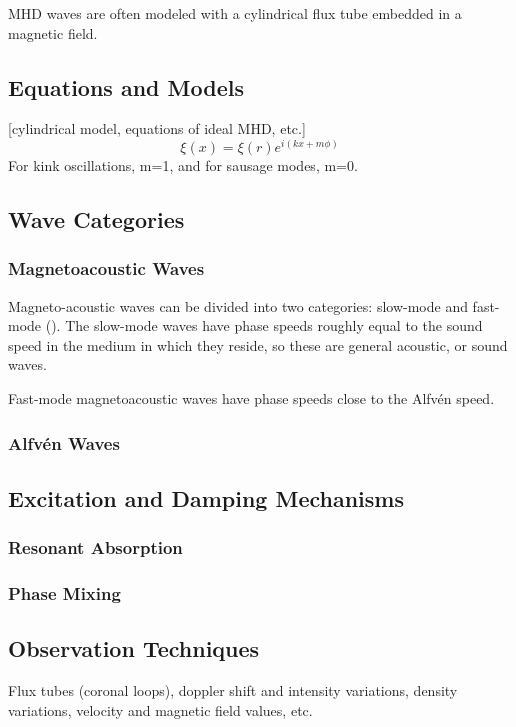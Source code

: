 \documentclass[preprint2]{aastex}
\begin{document}
MHD waves are often modeled with a cylindrical flux tube embedded
in a magnetic field.


\subsection{Equations and Models}
[cylindrical model, equations of ideal MHD, etc.]
$$ \xi(x) = \xi(r)e^{i(kx+m\phi)} $$
For kink oscillations, m=1, and for sausage modes, m=0.
\subsection{Wave Categories}
\subsubsection{Magnetoacoustic Waves}
Magneto-acoustic waves can be divided into two categories:
slow-mode and fast-mode (\cite{Aschwanden}).
The slow-mode waves have phase speeds roughly equal to the sound speed
in the medium in which they reside, so these are general acoustic, or
sound waves.

Fast-mode magnetoacoustic waves have phase speeds close to the Alfv\'en
speed.
\subsubsection{Alfv\'en Waves}
\subsection{Excitation and Damping Mechanisms}
\subsubsection{Resonant Absorption}
\subsubsection{Phase Mixing}
\subsection{Observation Techniques}
Flux tubes (coronal loops), doppler shift and intensity variations,
density variations, velocity and magnetic field values,
etc.
\end{document}
